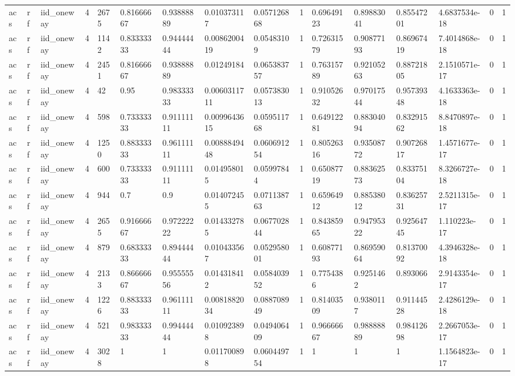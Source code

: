 \begin{tabular}{llllllllllllllll}
acs & rf & iid\_oneway & 4 & 2675 & 0.81666667 & 0.93888889 & 0.010373117 & 0.057126868 & 1 & 0.69649123 & 0.89883041 & 0.85547201 & 4.6837534e-18 & 0 & 1 \\
acs & rf & iid\_oneway & 4 & 1142 & 0.83333333 & 0.94444444 & 0.0086200419 & 0.05483109 & 1 & 0.72631579 & 0.90877193 & 0.86967419 & 7.4014868e-18 & 0 & 1 \\
acs & rf & iid\_oneway & 4 & 2451 & 0.81666667 & 0.93888889 & 0.01249184 & 0.065383757 & 1 & 0.76315789 & 0.92105263 & 0.88721805 & 2.1510571e-17 & 0 & 1 \\
acs & rf & iid\_oneway & 4 & 42 & 0.95 & 0.98333333 & 0.0060311711 & 0.057383013 & 1 & 0.91052632 & 0.97017544 & 0.95739348 & 4.1633363e-18 & 0 & 1 \\
acs & rf & iid\_oneway & 4 & 598 & 0.73333333 & 0.91111111 & 0.0099643615 & 0.059511768 & 1 & 0.64912281 & 0.88304094 & 0.83291562 & 8.8470897e-18 & 0 & 1 \\
acs & rf & iid\_oneway & 4 & 1250 & 0.88333333 & 0.96111111 & 0.0088849448 & 0.060691254 & 1 & 0.80526316 & 0.93508772 & 0.90726817 & 1.4571677e-17 & 0 & 1 \\
acs & rf & iid\_oneway & 4 & 600 & 0.73333333 & 0.91111111 & 0.014958015 & 0.05997844 & 1 & 0.65087719 & 0.88362573 & 0.83375104 & 8.3266727e-18 & 0 & 1 \\
acs & rf & iid\_oneway & 4 & 944 & 0.7 & 0.9 & 0.014072455 & 0.071138763 & 1 & 0.65964912 & 0.88538012 & 0.83625731 & 2.5211315e-17 & 0 & 1 \\
acs & rf & iid\_oneway & 4 & 2655 & 0.91666667 & 0.97222222 & 0.014332785 & 0.067702844 & 1 & 0.84385965 & 0.94795322 & 0.92564745 & 1.110223e-17 & 0 & 1 \\
acs & rf & iid\_oneway & 4 & 879 & 0.68333333 & 0.89444444 & 0.010433567 & 0.052958001 & 1 & 0.60877193 & 0.86959064 & 0.81370092 & 4.3946328e-18 & 0 & 1 \\
acs & rf & iid\_oneway & 4 & 2133 & 0.86666667 & 0.95555556 & 0.014318412 & 0.058403952 & 1 & 0.7754386 & 0.9251462 & 0.893066 & 2.9143354e-17 & 0 & 1 \\
acs & rf & iid\_oneway & 4 & 1226 & 0.88333333 & 0.96111111 & 0.0081882034 & 0.088708949 & 1 & 0.81403509 & 0.9380117 & 0.91144528 & 2.4286129e-18 & 0 & 1 \\
acs & rf & iid\_oneway & 4 & 521 & 0.98333333 & 0.99444444 & 0.010923898 & 0.049406409 & 1 & 0.96666667 & 0.98888889 & 0.98412698 & 2.2667053e-17 & 0 & 1 \\
acs & rf & iid\_oneway & 4 & 3028 & 1 & 1 & 0.011700898 & 0.060449754 & 1 & 1 & 1 & 1 & 1.1564823e-17 & 0 & 1 \\

\end{tabular}
